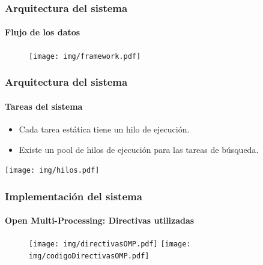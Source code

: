 \documentclass[11pt,a4paper,spanish]{beamer}
\begin{document}
\begin{frame}

\frametitle{Arquitectura del sistema}

\framesubtitle{Flujo de los datos}

\begin{figure}[h]

	\centering

	\texttt{[image: img/framework.pdf]}

\end{figure}

\end{frame}

\begin{frame}

\frametitle{Arquitectura del sistema}

\framesubtitle{Tareas del sistema}

\begin{itemize}

	\item Cada tarea estática tiene un hilo de ejecución.

	\item Existe un pool de hilos de ejecución para las tareas de búsqueda.

\end{itemize}

\texttt{[image: img/hilos.pdf]}

\end{frame}

\begin{frame}

\frametitle{Implementación del sistema}

\framesubtitle{Open Multi-Processing: Directivas utilizadas}

\begin{figure}[!htb]

	\centering

	\texttt{[image: img/directivasOMP.pdf]}
	\texttt{[image: img/codigoDirectivasOMP.pdf]}

\end{figure}

\end{frame}
\end{document}
